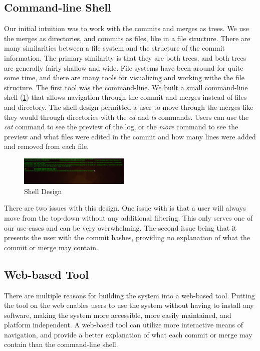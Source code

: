 \documentclass[conference, draftclsnofoot]{IEEEtran}
\begin{document}
\subsection{Command-line Shell}
Our initial intuition was to work with the commits and merges as trees. We use
the merges as directories, and commits as files, like in a file structure.
There are many similarities between a file system and the structure of the
commit information. The primary similarity is that they are both trees, and
both trees are generally fairly shallow and wide. File systems have been
around for quite some time, and there are many tools for visualizing and
working withe the file structure. The first tool was the command-line. We built
a small command-line shell (\ref{fig:shell}) that allows navigation through
the commit and merges instead of files and directory. The shell design
permitted a user to move through the merges like they would through
directories with the \textit{cd} and \textit{ls} commands. Users can use the
\textit{cat} command to see the preview of the log, or the \textit{more}
command to see the preview and what files were edited in the commit and how
many lines were added and removed from each file.

\begin{figure}[h]
	\centering
	\includegraphics[width=0.47\textwidth]{figures/shell.png}
	\caption{Shell Design}
	\label{fig:shell}
\end{figure}

There are two issues with this design. One issue with is that a user will
always move from the top-down without any additional filtering. This only
serves one of our use-cases and can be very overwhelming. The second issue
being that it presents the user with the commit hashes, providing no
explanation of what the commit or merge may contain.

\subsection{Web-based Tool}
There are multiple reasons for building the system into a web-based tool.
Putting the tool on the web enables users to use the system without having to
install any software, making the system more accessible, more easily
maintained, and platform independent. A web-based tool can utilize more
interactive means of navigation, and provide a better explanation of what each
commit or merge may contain than the command-line shell.
\end{document}
